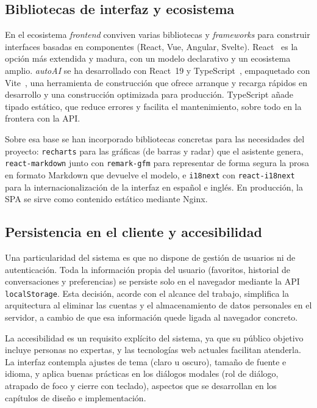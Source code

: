 \subsection{Bibliotecas de interfaz y ecosistema}

En el ecosistema \emph{frontend} conviven varias bibliotecas y \emph{frameworks}
para construir interfaces basadas en componentes (React, Vue, Angular, Svelte).
React~\cite{react2024} es la opción más extendida y madura, con un modelo declarativo y un
ecosistema amplio. \emph{autoAI} se ha desarrollado con React~19 y TypeScript~\cite{typescript2024},
empaquetado con Vite~\cite{vite2024}, una herramienta de construcción que ofrece arranque y recarga
rápidos en desarrollo y una construcción optimizada para producción. TypeScript
añade tipado estático, que reduce errores y facilita el mantenimiento, sobre todo
en la frontera con la API.

Sobre esa base se han incorporado bibliotecas concretas para las necesidades del
proyecto: \texttt{recharts} para las gráficas (de barras y radar) que el asistente
genera, \texttt{react-markdown} junto con \texttt{remark-gfm} para representar de
forma segura la prosa en formato Markdown que devuelve el modelo, e
\texttt{i18next} con \texttt{react-i18next} para la internacionalización de la
interfaz en español e inglés. En producción, la SPA se sirve como contenido
estático mediante Nginx.

\subsection{Persistencia en el cliente y accesibilidad}

Una particularidad del sistema es que no dispone de gestión de usuarios ni de
autenticación. Toda la información propia del usuario (favoritos, historial de
conversaciones y preferencias) se persiste solo en el navegador mediante la API
\texttt{localStorage}. Esta decisión, acorde con el alcance del trabajo, simplifica
la arquitectura al eliminar las cuentas y el almacenamiento de datos personales en
el servidor, a cambio de que esa información quede ligada al navegador concreto.

La accesibilidad es un requisito explícito del sistema, ya que su público objetivo
incluye personas no expertas, y las tecnologías web actuales facilitan atenderla.
La interfaz contempla ajustes de tema (claro u oscuro), tamaño de fuente e idioma,
y aplica buenas prácticas en los diálogos modales (rol de diálogo, atrapado de foco
y cierre con teclado), aspectos que se desarrollan en los capítulos de diseño e
implementación.

